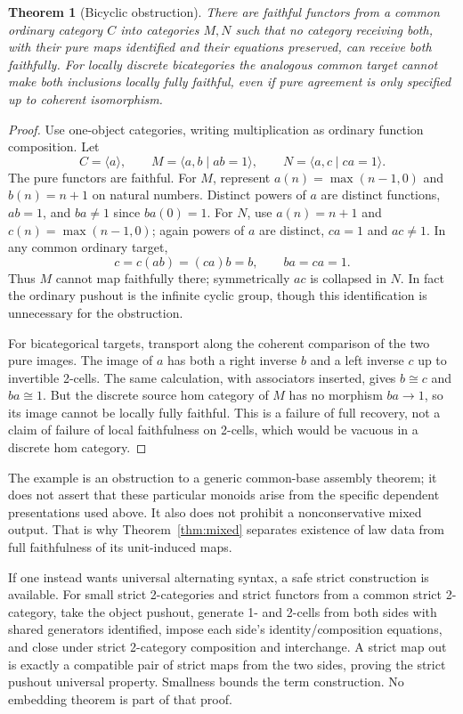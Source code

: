 \documentclass[11pt]{article}
\newtheorem{theorem}{Theorem}[section]
\theoremstyle{definition}
\begin{document}
\begin{theorem}[Bicyclic obstruction]\label{thm:bicyclic}
There are faithful functors from a common ordinary category $C$ into
categories $M,N$ such that no category receiving both, with their pure maps
identified and their equations preserved, can receive both faithfully.
For locally discrete bicategories the analogous common target cannot make
both inclusions locally fully faithful, even if pure agreement is only
specified up to coherent isomorphism.
\end{theorem}
\begin{proof}
Use one-object categories, writing multiplication as ordinary function
composition. Let
\[
 C=\langle a\rangle,\qquad
 M=\langle a,b\mid ab=1\rangle,\qquad
 N=\langle a,c\mid ca=1\rangle.
\]
The pure functors are faithful. For $M$, represent $a(n)=\max(n-1,0)$ and
$b(n)=n+1$ on natural numbers. Distinct powers of $a$ are distinct functions,
$ab=1$, and $ba\ne1$ since $ba(0)=1$. For $N$, use $a(n)=n+1$ and
$c(n)=\max(n-1,0)$; again powers of $a$ are distinct, $ca=1$ and $ac\ne1$.
In any common ordinary target,
\[
 c=c(ab)=(ca)b=b,
 \qquad ba=ca=1.
\]
Thus $M$ cannot map faithfully there; symmetrically $ac$ is collapsed in
$N$. In fact the ordinary pushout is the infinite cyclic group, though this
identification is unnecessary for the obstruction.

For bicategorical targets, transport along the coherent comparison of the
two pure images. The image of $a$ has both a right inverse $b$ and a left
inverse $c$ up to invertible 2-cells. The same calculation, with associators
inserted, gives $b\cong c$ and $ba\cong1$. But the discrete source hom
category of $M$ has no morphism $ba\to1$, so its image cannot be locally
fully faithful. This is a failure of full recovery, not a claim of failure
of local faithfulness on 2-cells, which would be vacuous in a discrete hom
category.
\end{proof}

The example is an obstruction to a generic common-base assembly theorem;
it does not assert that these particular monoids arise from the specific
dependent presentations used above. It also does not prohibit a
nonconservative mixed output. That is why Theorem~\ref{thm:mixed} separates
existence of law data from full faithfulness of its unit-induced maps.

If one instead wants universal alternating syntax, a safe strict
construction is available. For small strict 2-categories and strict functors
from a common strict 2-category, take the object pushout, generate 1- and
2-cells from both sides with shared generators identified, impose each
side's identity/composition equations, and close under strict 2-category
composition and interchange. A strict map out is exactly a compatible pair
of strict maps from the two sides, proving the strict pushout universal
property. Smallness bounds the term construction. No embedding theorem is
part of that proof.
\end{document}

